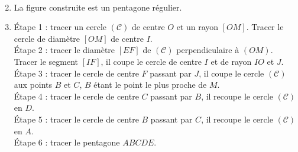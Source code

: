 \ \\ [-5mm]
   \begin{enumerate}
      \setcounter{enumi}{1}
      \item La figure construite est un {\blue pentagone régulier}.
      \item Étape 1 : tracer un cercle $(\mathcal{C})$ de centre $O$ et un rayon $[OM]$. Tracer le cercle de diamètre $[OM]$ de centre $I$. \\
         Étape 2 : tracer le diamètre $[EF]$ de $(\mathcal{C})$ perpendiculaire à $(OM)$. Tracer le segment $[IF]$, il coupe le cercle de centre $I$ et de rayon $IO$ et $J$. \\
         Étape 3 : tracer le cercle de centre $F$ passant par $J$, il coupe le cercle $(\mathcal{C})$ aux points $B$ et $C$, $B$ étant le point le plus proche de $M$. \\
         Étape 4 : tracer le cercle de centre $C$ passant par $B$, il recoupe le cercle $(\mathcal{C})$ en $D$. \\
         Étape 5 : tracer le cercle de centre $B$ passant par $C$, il recoupe le cercle $(\mathcal{C})$ en $A$. \\
         Étape 6 : tracer le pentagone $ABCDE$.
   \end{enumerate}
